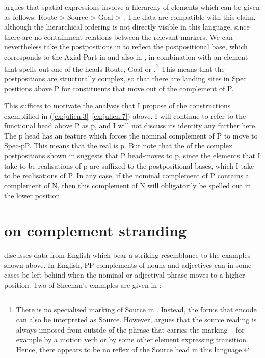 \documentclass[output=paper]{LSP/langsci}
\begin{document}
\citet{Pantcheva2011} argues that spatial expressions involve a  hierarchy of elements which can be given as follows: Route > Source > Goal > . The  data are compatible with this claim, although the hierarchical ordering is not directly visible in this language, since there are no containment relations between the relevant markers. We can nevertheless take the postpositions in  to reflect the postpositional base, which corresponds to the Axial Part in \citet{Pantcheva2011} and also in \citet{Svenonius2006axialparts}, in combination with an element that spells out one of the heads Route, Goal or .\footnote{There is no specialised marking of Source in . Instead, the forms that encode  can also be interpreted as Source. However, \citet{Svenonius2009} argues that the source reading is always imposed from outside of the phrase that carries the marking – for example by a motion verb or by some other element expressing transition. Hence, there appears to be no reflex of the Source head in this language.} This means that the  postpositions are structurally complex, so that there are landing sites in Spec positions above P for constituents that move out of the complement of P. 

This suffices to motivate the analysis that I propose of the constructions exemplified in (\ref{ex:julien:3}–\ref{ex:julien:7}) above. I will continue to refer to the functional head above P as p, and I will not discuss its identity any further here. The p head has an  feature which forces the nominal complement of P to move to Spec-pP. This means that the real  is p. But note that the  of the complex postpositions shown in  suggests that P head-moves to p, since the elements that I take to be realisations of p are suffixed to the postpositional bases, which I take to be realisations of P. In any case, if the nominal complement of P contains a complement of N, then this complement of N will obligatorily be spelled out in the lower position.

\section{\citet{Sheehan2009} on complement stranding} %
\citet{Sheehan2009} discusses data from English which bear a striking resemblance to the  examples shown above. In English, PP complements of nouns and adjectives can in some cases be left behind when the nominal or adjectival phrase moves to a higher position. Two of Sheehan’s examples are given in :\largerpage
\end{document}
